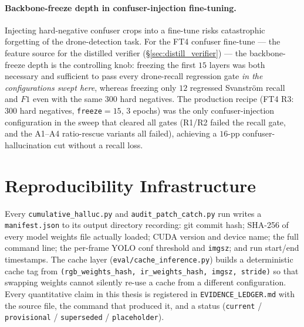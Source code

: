 \documentclass[12pt,a4paper,oneside,openright]{book}
\begin{document}
\paragraph{Backbone-freeze depth in confuser-injection fine-tuning.}
Injecting hard-negative confuser crops into a fine-tune risks catastrophic forgetting of the drone-detection task. For the FT4 confuser fine-tune --- the feature source for the distilled verifier (\S\ref{sec:distill_verifier}) --- the backbone-freeze depth is the controlling knob: freezing the first $15$ layers was both necessary and sufficient to pass every drone-recall regression gate \emph{in the configurations swept here}, whereas freezing only $12$ regressed Svanstr\"om recall and $F1$ even with the same $300$ hard negatives. The production recipe (FT4 R3: $300$ hard negatives, \texttt{freeze}$=15$, $3$ epochs) was the only confuser-injection configuration in the sweep that cleared all gates (R1/R2 failed the recall gate, and the A1--A4 ratio-rescue variants all failed), achieving a $16$-pp confuser-hallucination cut without a recall loss.

\section{Reproducibility Infrastructure}
\label{sec:reproducibility}

Every \texttt{cumulative\_halluc.py} and \texttt{audit\_patch\_catch.py} run writes a \texttt{manifest.json} to its output directory recording: git commit hash; SHA-256 of every model weights file actually loaded; CUDA version and device name; the full command line; the per-frame YOLO conf threshold and \texttt{imgsz}; and run start/end timestamps. The cache layer (\texttt{eval/cache\_inference.py}) builds a deterministic cache tag from \texttt{(rgb\_weights\_hash, ir\_weights\_hash, imgsz, stride)} so that swapping weights cannot silently re-use a cache from a different configuration. Every quantitative claim in this thesis is registered in \texttt{EVIDENCE\_LEDGER.md} with the source file, the command that produced it, and a status (\texttt{current} / \texttt{provisional} / \texttt{superseded} / \texttt{placeholder}).
\end{document}
